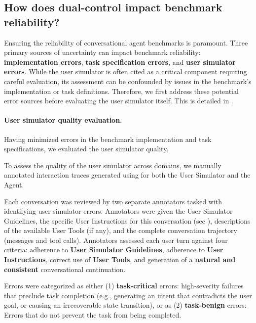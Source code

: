 \subsection{How does dual-control impact benchmark reliability?}
\label{sec:reliability}

Ensuring the reliability of conversational agent benchmarks is paramount. Three primary sources of uncertainty can impact benchmark reliability: \textbf{implementation errors}, \textbf{task specification errors}, and \textbf{user simulator errors}. While the user simulator is often cited as a critical component requiring careful evaluation, its assessment can be confounded by issues in the benchmark's implementation or task definitions. Therefore, we first address these potential error sources before evaluating the user simulator itself. This is detailed in .

\paragraph{User simulator quality evaluation.}

Having minimized errors in the benchmark implementation and task specifications, we evaluated the user simulator quality.

To assess the quality of the user simulator across domains, we manually annotated interaction traces generated using \gptmodelshort for both the User Simulator and the Agent.

Each conversation was reviewed by two separate annotators tasked with identifying user simulator errors. 
Annotators were given the User Simulator Guidelines, the specific User Instructions for this conversation (see ), descriptions of the available User Tools (if any), and the complete conversation trajectory (messages and tool calls). Annotators assessed each user turn against four criteria: adherence to \textbf{User Simulator Guidelines}, adherence to \textbf{User Instructions}, correct use of \textbf{User Tools}, and generation of a \textbf{natural and consistent} conversational continuation.

Errors were categorized as either (1) \textbf{task‑critical} errors: high‑severity failures that preclude task completion (e.g., generating an intent that contradicts the user goal, or causing an irrecoverable state transition),  or as (2) \textbf{task‑benign} errors: Errors that do not prevent the task from being completed.




